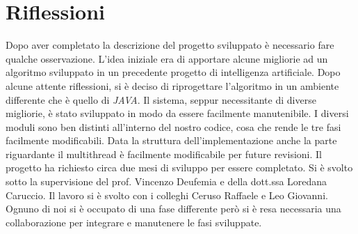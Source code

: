 \section{Riflessioni}
Dopo aver completato la descrizione del progetto sviluppato è necessario fare qualche osservazione.
L'idea iniziale era di apportare alcune migliorie ad un algoritmo sviluppato in un precedente progetto di intelligenza artificiale\cite{tesinaIA}. Dopo alcune attente riflessioni, si è deciso di riprogettare l'algoritmo in un ambiente differente che è quello di \emph{JAVA}.
Il sistema, seppur necessitante di diverse migliorie, è stato sviluppato in modo da essere facilmente manutenibile. I diversi moduli sono ben distinti all'interno del nostro codice, cosa che rende le tre fasi facilmente modificabili. Data la struttura dell'implementazione anche la parte riguardante il multithread è facilmente modificabile per future revisioni.
Il progetto ha richiesto circa due mesi di sviluppo per essere completato. Si è svolto sotto la supervisione del prof. Vincenzo Deufemia e della dott.ssa Loredana Caruccio. Il lavoro si è svolto con i colleghi Ceruso Raffaele e Leo Giovanni. Ognuno di noi si è occupato di una fase differente però si è resa necessaria una collaborazione per integrare e manutenere le fasi sviluppate. 